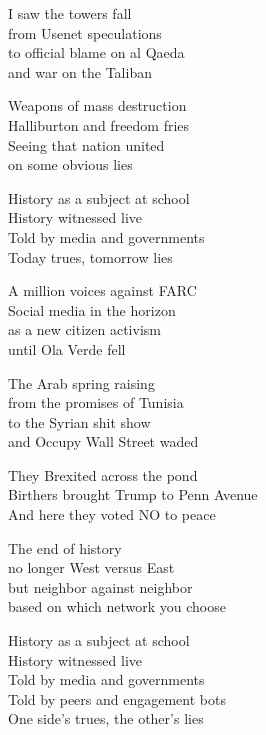\begin{lyrics}
I saw the towers fall\\
from Usenet speculations\\
to official blame on al Qaeda\\
and war on the Taliban

Weapons of mass destruction\\
Halliburton and freedom fries\\
Seeing that nation united\\
on some obvious lies

History as a subject at school\\
History witnessed live\\
Told by media and governments\\
Today trues, tomorrow lies

A million voices against FARC\\
Social media in the horizon\\
as a new citizen activism\\
until Ola Verde fell

The Arab spring raising\\
from the promises of Tunisia\\
to the Syrian shit show\\
and Occupy Wall Street waded

They Brexited across the pond\\
Birthers brought Trump to Penn Avenue\\
And here they voted NO to peace

The end of history\\
no longer West versus East\\
but neighbor against neighbor\\
based on which network you choose

History as a subject at school\\
History witnessed live\\
Told by media and governments\\
Told by peers and engagement bots\\
One side's trues, the other's lies
\end{lyrics}

